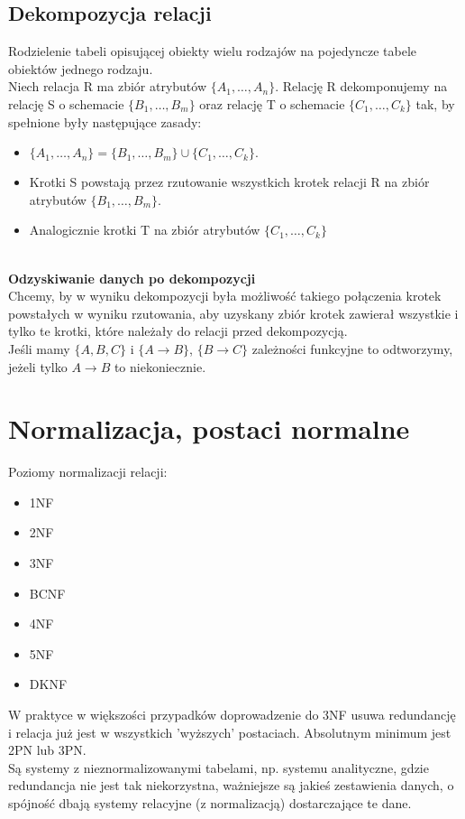 \documentclass[a4paper]{article}
\begin{document}
\subsection{Dekompozycja relacji} 
Rodzielenie tabeli opisującej obiekty wielu rodzajów na pojedyncze tabele obiektów jednego rodzaju.\\

Niech relacja R ma zbiór atrybutów $\{A_1,\dots, A_n\}$. Relację R dekomponujemy na relację S o schemacie $\{B_1, \dots , B_m\}$ oraz relację T o schemacie $\{C_1, \dots, C_k\}$ tak, by spełnione były następujące zasady:
\begin{itemize}
\item $\{A_1, \dots , A_n\} = \{B_1, \dots , B_m\} \cup \{C_1, \dots , C_k\}.$
\item Krotki S powstają przez rzutowanie wszystkich krotek relacji R na zbiór atrybutów $\{B_1, \dots , B_m\}$.
\item Analogicznie krotki T na zbiór atrybutów $\{C_1, \dots, C_k\}$
\end{itemize}
\hfill \\
\textbf{Odzyskiwanie danych po dekompozycji}\\
Chcemy, by w wyniku dekompozycji była możliwość takiego połączenia krotek powstałych w wyniku rzutowania, aby uzyskany zbiór krotek zawierał wszystkie i tylko te krotki, które
należały do relacji przed dekompozycją.\\
Jeśli mamy $\{A,B,C\}$ i $\{A \rightarrow B\}$, $\{B\rightarrow C\}$ zależności funkcyjne to odtworzymy, jeżeli tylko $A \rightarrow B$ to niekoniecznie.

\section{Normalizacja, postaci normalne}
Poziomy normalizacji relacji:
\begin{itemize}
    \item 1NF
    \item 2NF
    \item 3NF
    \item BCNF
    \item 4NF
    \item 5NF
    \item DKNF
\end{itemize}
W praktyce w większości przypadków doprowadzenie do 3NF usuwa redundancję i relacja już jest w wszystkich 'wyższych' postaciach. Absolutnym minimum jest 2PN lub 3PN.\\
Są systemy z nieznormalizowanymi tabelami, np. systemu analityczne, gdzie redundancja nie jest tak niekorzystna, ważniejsze są jakieś zestawienia danych, o spójność dbają systemy relacyjne (z normalizacją) dostarczające te dane.
\end{document}
